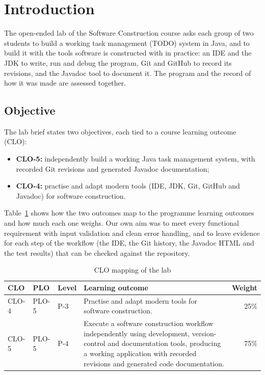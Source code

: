 \section{Introduction}\label{sec:introduction}

The open-ended lab of the Software Construction course asks each group of two students to build a working task
management (TODO) system in Java, and to build it with the tools software is constructed with in practice: an IDE and
the JDK to write, run and debug the program, Git and GitHub to record its revisions, and the Javadoc tool to document
it. The program and the record of how it was made are assessed together.

\subsection{Objective}

The lab brief states two objectives, each tied to a course learning outcome (CLO):
\begin{itemize}
  \item \textbf{CLO-5:} independently build a working Java task management system, with recorded Git revisions and
        generated Javadoc documentation;
  \item \textbf{CLO-4:} practise and adapt modern tools (IDE, JDK, Git, GitHub and Javadoc) for software construction.
\end{itemize}
Table~\ref{tab:clo} shows how the two outcomes map to the programme learning outcomes and how much each one weighs.
Our own aim was to meet every functional requirement with input validation and clean error handling, and to leave
evidence for each step of the workflow (the IDE, the Git history, the Javadoc HTML and the test results) that can be
checked against the repository.

\begin{table}[!t]
  \caption{CLO mapping of the lab}\label{tab:clo}
  \centering\footnotesize
  \begin{tabularx}{\linewidth}{@{}lllXr@{}}
    \toprule
    CLO   & PLO   & Level & Learning outcome & Weight \\
    \midrule
    CLO-4 & PLO-5 & P-3   & Practise and adapt modern tools for software construction. & 25\% \\
    CLO-5 & PLO-5 & P-4   & Execute a software construction workflow independently using development,
                            version-control and documentation tools, producing a working application with recorded
                            revisions and generated code documentation. & 75\% \\
    \bottomrule
  \end{tabularx}
\end{table}


